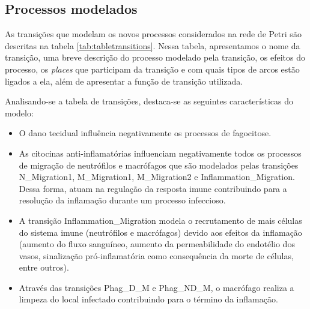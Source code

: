\documentclass[a4paper,10pt]{article}
\begin{document}
		\subsection{Processos modelados}
						
		As transições que modelam os novos processos considerados na rede de Petri são descritas na tabela \ref{tab:tabletransitions}.
		Nessa tabela, apresentamos o nome da transição, uma breve descrição do processo modelado pela transição, os efeitos do processo, 
		os \textit{places} que participam da transição e com quais tipos de arcos estão ligados a ela, além de apresentar a função de transição utilizada. 
	
		
		
		Analisando-se a tabela de transições, destaca-se as seguintes características do modelo:
		\begin{itemize}
		 \item O dano tecidual influência negativamente os processos de fagocitose. %
		 \item As citocinas anti-inflamatórias influenciam negativamente todos os processos de migração de neutrófilos e macrófagos 
		 que são modelados pelas transições N\_Migration1, M\_Migration1, M\_Migration2 e Inflammation\_Migration. Dessa forma, 
		 atuam na regulação da resposta imune contribuindo para a resolução da inflamação durante um processo infeccioso. 
		 \item A transição Inflammation\_Migration modela o recrutamento de mais células do sistema imune (neutrófilos e macrófagos) 
		 devido aos efeitos da inflamação (aumento do fluxo sanguíneo, aumento da permeabilidade do endotélio dos vasos, sinalização 
		 pró-inflamatória como consequência da morte de células, entre outros).
		 \item Através das transições Phag\_D\_M e Phag\_ND\_M, o macrófago realiza a limpeza do local infectado 
		 contribuindo para o término da inflamação. 
		 
		\end{itemize}

		
		
	
\end{document}
